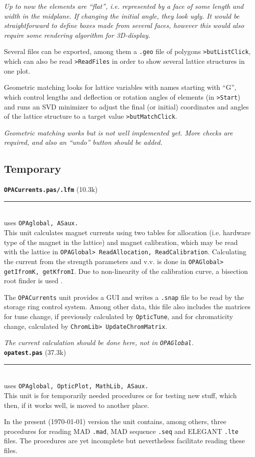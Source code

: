 \documentclass[12pt]{article}
\newcommand\code[1]{{\tt #1}}
\newcommand{\todo}[1]{{\color{red}\em #1}}
\newcommand\opamodule[3]{{\bf \tt #1} #2\\  \rule[3pt]{\textwidth}{0.2pt} \\ {\scriptsize uses \tt  #3}\\[1ex]}
\begin{document}
\todo{Up to now the elements are ``flat'', i.e. represented by a face of some length and width in the midplane. If changing the initial angle, they look ugly. It would be straightforward to define boxes made from several faces, however this would also require some rendering algorithm for 3D-display.}

Several files can be exported, among them a \code{.geo} file of polygons \code{>butListClick}, which can also be read \code{>ReadFiles} in order to show several lattice structures in one plot.

Geometric matching looks for lattice variables with names starting with ``G'', which control lengths and deflection or rotation angles of elements (in \code{>Start}) and runs an SVD minimizer to adjust the final (or initial) coordinates and angles of the lattice structure to a target value \code{>butMatchClick}.

\todo{Geometric matching works but is not well implemented yet. More checks are required, and also an ``undo'' button should be added.}


\subsection{Temporary}
\opamodule{OPACurrents.pas/.lfm}{(10.3k)}{OPAglobal, ASaux.}
This unit calculates magnet currents using two tables for allocation (i.e. hardware type of the magnet in the lattice) and magnet calibration, which may be read with the lattice in \code{OPAGlobal> ReadAllocation, ReadCalibration}. Calculating the current from the strength parameters and v.v. is done in \code{OPAGlobal> getIfromK, getKfromI}. Due to non-linearity of the calibration curve, a bisection root finder is used \cite{numrec}.

The {\tt OPACurrents} unit provides a GUI and writes a {\tt .snap} file to be read by the storage ring control system. Among other data, this file also includes the matrices for tune change, if previously calculated by \code{OpticTune}, and for chromaticity change, calculated by \code{ChromLib> UpdateChromMatrix}.

\todo{The current calculation should be done here, not in {\tt OPAGlobal}.}\\


\opamodule{opatest.pas}{(37.3k)}{OPAglobal, OpticPlot, MathLib, ASaux.}
This unit is for temporarily needed procedures or for testing new stuff, which then, if it works well, is moved to another place.

In the present (\today) version the unit contains, among others, three procedures for reading MAD {\tt .mad}, MAD sequence {\tt .seq} and ELEGANT {\tt .lte} files. The procedures are yet incomplete but nevertheless facilitate reading these files.\\
\end{document}

